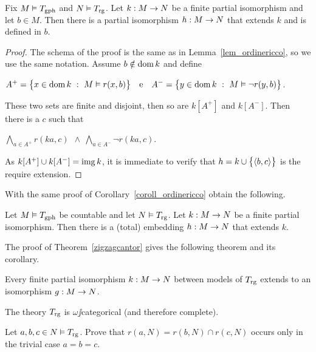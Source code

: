 \documentclass[creche.tex]{subfiles}
\begin{document}
\begin{lemma}\label{lem_graforicco}
Fix $M\models T_{\rm gph}$ and $N\models T_{\rm rg}$. Let $k:M\imp N$ be a finite partial isomorphism and let $b\in M$. Then there is a partial isomorphism $h:M\imp N$ that extends $k$ and is defined in $b$.
\end{lemma}
\begin{proof} The schema of the proof is the same as in Lemma~\ref{lem_ordinericco}, so we use the same notation. Assume $b\notin\dom k$ and define\medskip

\hfil$A^+=\big\{x\in\dom k\ :\ M\models r(x,b)\big\}\ \ \ \textrm{e}\ \ \ A^-=\big\{y\in\dom k\ :\  M\models \neg r(y,b)\big\}$.\medskip

These two sets are finite and disjoint, then so are $k[A^+]$ and $k[A^-]$. Then there is a $c$ such that\medskip

\hfil$\displaystyle\bigwedge_{a\in A^+}r(ka,c)\ \ \wedge\ \bigwedge_{a\in A^-}\neg r(ka,c)$.

As $k[A^+]\cup k[A^-]=\range k$, it is immediate to verify that $h=k\cup\big\{\<b,c\>\big\}$ is the require extension.
\end{proof}

With the same proof of Corollary~\ref{coroll_ordinericco} obtain the following.

\begin{corollary}\label{coroll_graforicco}
Let $M\models T_{\rm gph}$ be countable and let $N\models T_{\rm rg}$. Let $k:M\imp N$ be a finite partial isomorphism. Then there is a (total) embedding $h:M\imp N$ that extends $k$.\QED
\end{corollary}

The proof of Theorem~\ref{zigzagcantor} gives the following theorem and its corollary.

\begin{theorem}\label{gaomegacat}
Every finite partial isomorphism $k:M\imp N$ between models of $T_{\rm rg}$ extends to an isomorphism $g:M\imp N$.\QED
\end{theorem}

\begin{corollary}
The theory $T_{\rm rg}$ is $\omega\jj$categorical (and therefore complete).\QED
\end{corollary}

\begin{exercise}
Let $a,b,c\in N\models T_{\rm rg}$. Prove that $r(a,N)=r(b,N)\cap r(c,N)$ occurs only in the trivial case $a=b=c$.\QED
\end{exercise}
\end{document}
